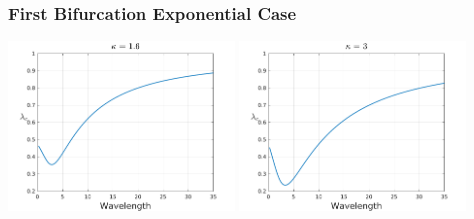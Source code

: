 \documentclass{beamer}
\begin{document}
\begin{frame}
\frametitle{\large First Bifurcation Exponential Case}

		\includegraphics[width=0.45\textwidth]{myFigures/firstBif_lambdac_exp_1_6}	
		\includegraphics[width=0.45\textwidth]{myFigures/firstBif_lambdac_exp_3_0}


\end{frame}
\end{document}
